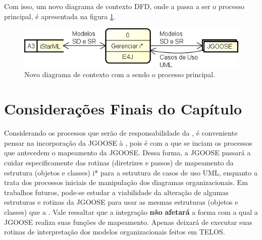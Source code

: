             Com isso, um novo diagrama de contexto DFD, onde a \ferramenta{} passa a ser o processo principal, é apresentada na figura \ref{fig:dfd-context-e4j}.
                \begin{figure}[h!]
                    \centering
                        \includegraphics[scale=0.8]{Figuras/dfd-context-e4j.png}
                        \caption{Novo diagrama de contexto com a \ferramenta{} sendo o processo principal.}
                        \label{fig:dfd-context-e4j}
                \end{figure}

    \section{Considerações Finais do Capítulo}
        Considerando os processos que serão de responsabilidade da \ferramenta{},
            é conveniente pensar na incorporação da JGOOSE à \ferramenta{}, pois é com a \ferramenta{} que se inciam os processos que antecedem o mapeamento da JGOOSE.
        Dessa forma, a JGOOSE passará a cuidar especificamente das rotinas (diretrizes e passos) de mapeamento da estrutura (objetos e classes) i* para a estrutura de casos de uso UML, enquanto a \ferramenta{} trata dos processos iniciais de manipulação dos diagramas organizacionais.
        Em trabalhos futuros, pode-se estudar a viabilidade da alteração de algumas estruturas e rotinas da JGOOSE para usar as mesmas estruturas (objetos e classes) que a \ferramenta{}.
        Vale ressaltar que a integração \textbf{não afetará} a forma com a qual a JGOOSE realiza suas funções de mapeamento. Apenas deixará de executar suas rotinas de interpretação dos modelos organizacionais feitos em TELOS.

% 
